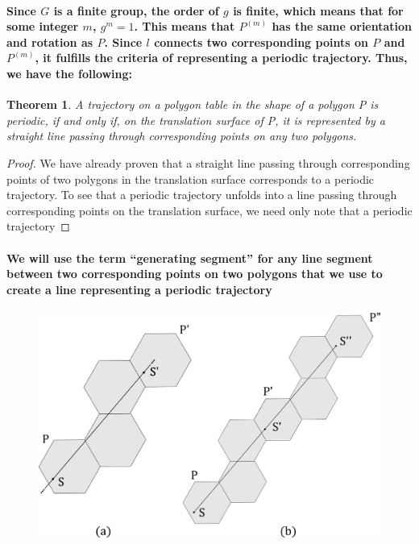 \documentclass{report}
\newtheorem{theorem}{Theorem}[chapter]
\begin{document}
\pagebreak



\paragraph{Since $G$ is a finite group, the order of $g$ is finite, which means that for some integer $m$, $g^m=1$. This means that $P^{(m)}$ has the same orientation and rotation as $P$. Since $l$ connects two corresponding points on $P$ and $P^{(m)}$, it fulfills the criteria of representing a periodic trajectory. Thus, we have the following:}

\begin{theorem}
A trajectory on a polygon table in the shape of a polygon P is periodic, if and only if, on the translation surface of P, it is represented by a straight line passing through corresponding points on any two polygons.
\end{theorem}

\begin{proof}
We have already proven that a straight line passing through corresponding points of two polygons in the translation surface corresponds to a periodic trajectory. To see that a periodic trajectory unfolds into a line passing through corresponding points on the translation surface, we need only note that a periodic trajectory 
\end{proof}

\paragraph{We will use the term “generating segment” for any line segment between two corresponding points on two polygons that we use to create a line representing a periodic trajectory}


\begin{figure} 
\begin{center}
\includegraphics[scale=0.3]{Tab2}
\caption{}
\end{center}
\end{figure}
\end{document}
